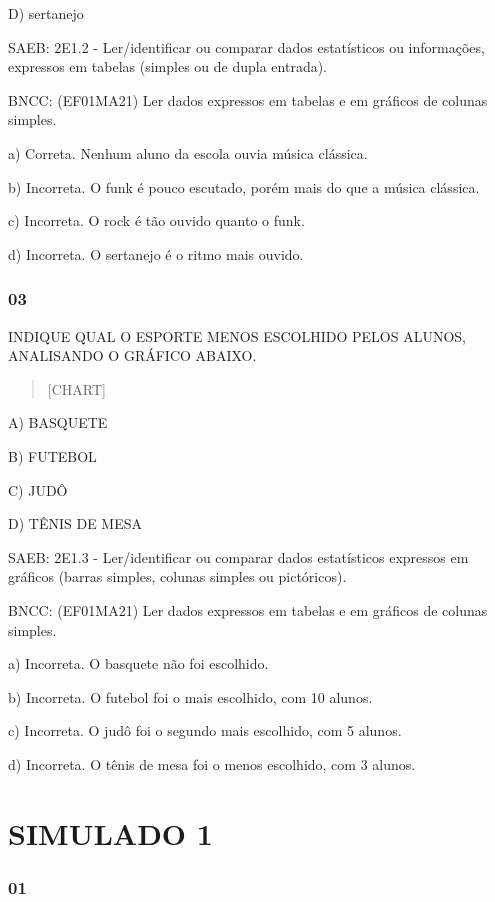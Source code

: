 D) sertanejo

\protect\hypertarget{_heading=h.1fob9te}{}{}SAEB: 2E1.2 -
Ler/identificar ou comparar dados estatísticos ou informações, expressos
em tabelas (simples ou de dupla entrada).

BNCC: (EF01MA21) Ler dados expressos em tabelas e em gráficos de colunas
simples.

a) Correta. Nenhum aluno da escola ouvia música clássica.

b) Incorreta. O funk é pouco escutado, porém mais do que a música
clássica.

c) Incorreta. O rock é tão ouvido quanto o funk.

d) Incorreta. O sertanejo é o ritmo mais ouvido.

\subsubsection{03}\label{section-86}

INDIQUE QUAL O ESPORTE MENOS ESCOLHIDO PELOS ALUNOS, ANALISANDO O
GRÁFICO ABAIXO.

\begin{quote}
{{[}CHART{]}}
\end{quote}

A) BASQUETE

B) FUTEBOL

C) JUDÔ

D) TÊNIS DE MESA

\protect\hypertarget{_heading=h.3znysh7}{}{}SAEB: 2E1.3 -
Ler/identificar ou comparar dados estatísticos expressos em gráficos
(barras simples, colunas simples ou pictóricos).

BNCC: (EF01MA21) Ler dados expressos em tabelas e em gráficos de colunas
simples.

a) Incorreta. O basquete não foi escolhido.

b) Incorreta. O futebol foi o mais escolhido, com 10 alunos.

c) Incorreta. O judô foi o segundo mais escolhido, com 5 alunos.

d) Incorreta. O tênis de mesa foi o menos escolhido, com 3 alunos.

\section{SIMULADO 1}\label{simulado-1}

\subsubsection{01}\label{section-87}


